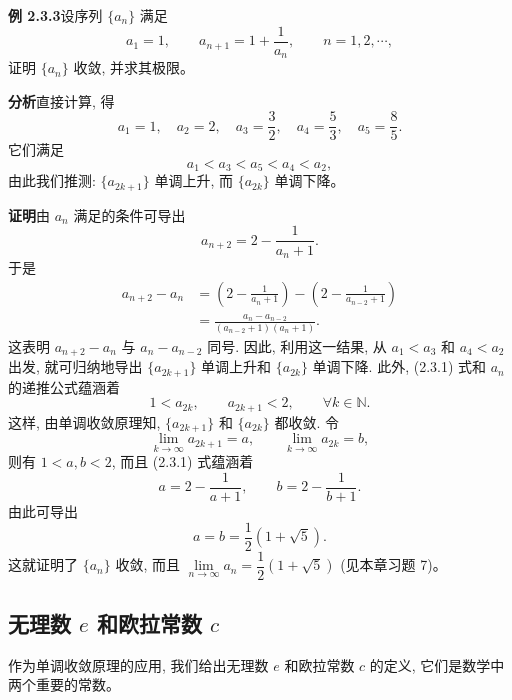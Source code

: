 \documentclass[UTF8, 12pt, fontset=fandol, oneside]{ctexart}
\begin{document}
\noindent\textbf{例 2.3.3}\quad 设序列 $\{a_n\}$ 满足
\[
  a_1=1,\qquad a_{n+1}=1+\frac1{a_n},\qquad n=1,2,\cdots,
\]
证明 $\{a_n\}$ 收敛, 并求其极限。

\noindent\textbf{分析}\quad 直接计算, 得
\[
  a_1=1,\quad a_2=2,\quad a_3=\frac32,\quad a_4=\frac53,\quad a_5=\frac85.
\]
它们满足
\[
  a_1<a_3<a_5<a_4<a_2,
\]
由此我们推测: $\{a_{2k+1}\}$ 单调上升, 而 $\{a_{2k}\}$ 单调下降。

\noindent\textbf{证明}\quad 由 $a_n$ 满足的条件可导出
\begin{equation}
  a_{n+2}=2-\frac1{a_n+1}.
  \tag{2.3.1}
\end{equation}
于是
\[
\begin{aligned}
  a_{n+2}-a_n
  &=
  \left(2-\frac1{a_n+1}\right)
  -
  \left(2-\frac1{a_{n-2}+1}\right)\\
  &=
  \frac{a_n-a_{n-2}}{(a_{n-2}+1)(a_n+1)}.
\end{aligned}
\]
这表明 $a_{n+2}-a_n$ 与 $a_n-a_{n-2}$ 同号. 因此, 利用这一结果, 从 $a_1<a_3$ 和 $a_4<a_2$ 出发, 就可归纳地导出 $\{a_{2k+1}\}$ 单调上升和 $\{a_{2k}\}$ 单调下降. 此外, (2.3.1) 式和 $a_n$ 的递推公式蕴涵着
\[
  1<a_{2k},\qquad a_{2k+1}<2,\qquad \forall k\in\mathbb{N}.
\]
这样, 由单调收敛原理知, $\{a_{2k+1}\}$ 和 $\{a_{2k}\}$ 都收敛. 令
\[
  \lim_{k\to\infty}a_{2k+1}=a,\qquad
  \lim_{k\to\infty}a_{2k}=b,
\]
则有 $1<a,b<2$, 而且 (2.3.1) 式蕴涵着
\[
  a=2-\frac1{a+1},\qquad b=2-\frac1{b+1}.
\]
由此可导出
\[
  a=b=\frac12(1+\sqrt5).
\]
这就证明了 $\{a_n\}$ 收敛, 而且 $\lim\limits_{n\to\infty}a_n=\dfrac12(1+\sqrt5)$ (见本章习题 7)。

\subsection{无理数 $e$ 和欧拉常数 $c$}

作为单调收敛原理的应用, 我们给出无理数 $e$ 和欧拉常数 $c$ 的定义, 它们是数学中两个重要的常数。
\end{document}

